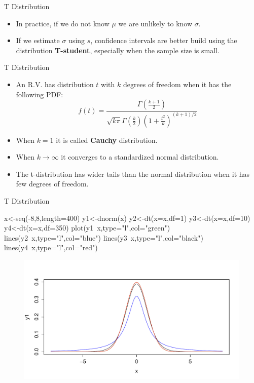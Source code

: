 \documentclass[handout]{beamer}
\begin{document}
\begin{frame}{T Distribution}
\scriptsize{
\begin{itemize}
 \item In practice, if we do not know $\mu$ we are unlikely to know $\sigma$.
 \item If we estimate $\sigma$ using $s$, confidence intervals are better build using the distribution \textbf{T-student}, especially when the sample size is small.
\end{itemize}

\begin{block}{T Distribution}
\begin{itemize}
 \item An R.V. has distribution $t$ with $k$ degrees of freedom when it has the following PDF:
\begin{displaymath}
 f(t)=\frac{\Gamma(\frac{k+1}{2})}{\sqrt{k\pi}\Gamma(\frac k2)(1+\frac{t^2}{k})^{(k+1)/2}}
\end{displaymath}
\item  When $k=1$ it is called \textbf{Cauchy} distribution.
\item When $k\rightarrow \infty$ it converges to a standardized normal distribution.
 \item The t-distribution has wider tails than the normal distribution when it has few degrees of freedom.


\end{itemize}

 
\end{block}




} 
\end{frame}

\begin{frame}[fragile]{T Distribution}
 \scriptsize{



\begin{verbatim*}
x<-seq(-8,8,length=400)
y1<-dnorm(x)
y2<-dt(x=x,df=1)
y3<-dt(x=x,df=10)
y4<-dt(x=x,df=350)
plot(y1~x,type="l",col="green")
lines(y2~x,type="l",col="blue")
lines(y3~x,type="l",col="black")
lines(y4~x,type="l",col="red")

\end{verbatim*}

 \begin{figure}[h!]
	\centering
	\includegraphics[scale=0.3]{pics/tstudent.pdf}
\end{figure}


}
\end{frame}
\end{document}

